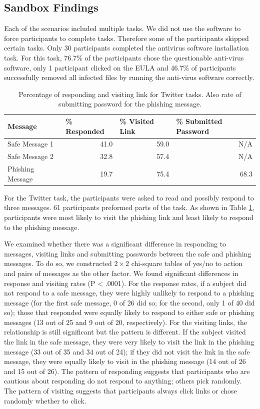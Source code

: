 \subsection{Sandbox Findings}
Each of the scenarios included multiple tasks. We did not use the software to force participants to complete tasks. Therefore some of the participants skipped certain tasks.
Only 30 participants completed the antivirus software installation task.
For this task, 76.7\% of the participants chose the questionable anti-virus software, only 1 participant clicked on the EULA and 46.7\% of participants successfully removed all infected files by running the anti-virus software correctly.


\begin{table}[tpb]
\caption{Percentage of responding and visiting link for Twitter tasks. Also rate of submitting password for the phishing message.}
\label{tab:twittertask}
\begin{tabular}{|l|r|r|r|}
\hline
Message & \multicolumn{1}{l|}{\% Responded} & \multicolumn{1}{l|}{\% Visited Link} & \multicolumn{1}{l|}{\% Submitted Password} \\ \hline
Safe Message 1   & 41.0 & 59.0 & N/A  \\
Safe Message 2   & 32.8 & 57.4 & N/A  \\
Phishing Message & 19.7 & 75.4 & 68.3 \\ \hline
\end{tabular}
\end{table}

For the Twitter task, the participants were asked to read and possibly respond to three messages. 61 participants preformed parts of the task. As shown in Table \ref{tab:twittertask}, participants were most likely to
visit the phishing link and least likely to respond to the phishing message.

We examined whether there was a significant difference in responding to messages, visiting links and submitting passwords between the safe and phishing messages. To do so, we constructed $2 \times 2$ chi-square tables of yes/no to action and pairs of messages as the other factor. We found significant differences in response and visiting rates (P < .0001). For the response rates, if a subject did not respond to a safe message, they were highly unlikely to respond to a phishing message (for the first safe message, 0 of 26 did so; for the second, only 1 of 40 did so); those that responded were equally likely to respond to either safe or phishing messages (13 out of 25 and 9 out of 20, respectively). For the visiting links, the relationship is still significant but the pattern is different. If the subject visited the link in the safe message, they were very likely to visit the link in the phishing message (33 out of 35 and 34 out of 24); if they did not visit the link in the safe message, they were equally likely to visit in the phishing message (14 out of 26 and 15 out of 26). The pattern of responding suggests that participants who are cautious about responding do not respond to anything; others pick randomly. The pattern of visiting suggests that participants always click links or chose randomly whether to click.

